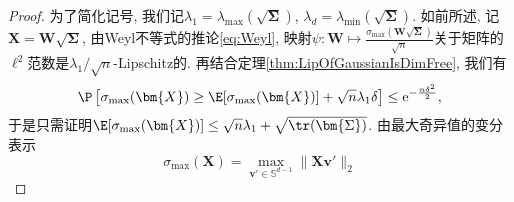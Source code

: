 \begin{proof}
	为了简化记号, 我们记$\lambda_1 = \lambda_{\max}(\sqrt{\bm{\Sigma}})$, $\lambda_d = \lambda_{\min}(\sqrt{\bm{\Sigma}})$. 
	如前所述, 记$\bm{X} = \bm{W} \sqrt{\bm{\Sigma}}$, 由Weyl不等式的推论\eqref{eq:Weyl}, 映射$\psi \colon \bm{W} \mapsto \frac{\sigma_{\max}(\bm{W} \sqrt{\bm{\Sigma}})}{\sqrt{n}}$关于矩阵的$\ell^2$范数是$\lambda_1 / \sqrt{n}$-Lipschitz的. 
	再结合定理\ref{thm:LipOfGaussianIsDimFree}, 我们有
	\begin{equation*}
		\P \left[ \sigma_{\max}(\bm{X}) \geq \E[ \sigma_{\max}(\bm{X}) ] + \sqrt{n} \lambda_1 \delta \right] 
		\leq \mathrm{e}^{-\frac{n \delta^2}{2}},  
	\end{equation*}
	于是只需证明$\E[ \sigma_{\max}(\bm{X}) ] \leq \sqrt{n} \lambda_1 + \sqrt{\tr(\bm{\Sigma})}$.
	由最大奇异值的变分表示
	\begin{equation*}
		\sigma_{\max}(\bm{X}) 
		= \max_{\bm{v'} \in \mathbb{S}^{d-1}} \| \bm{X} \bm{v}' \|_2
	\end{equation*}
\end{proof}






















